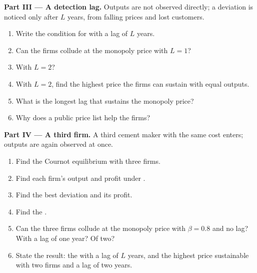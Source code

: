 \begin{problem}
\medskip
\noindent\textbf{Part III --- A detection lag.} Outputs are not observed directly; a deviation is noticed only after $L$
years, from falling prices and lost customers.
\begin{enumerate}[resume]
  \item Write the condition for  with a lag of $L$ years.
  \item Can the firms collude at the monopoly price with $L = 1$?
  \item With $L = 2$?
  \item With $L = 2$, find the highest price the firms can sustain with equal outputs.
  \item What is the longest lag that sustains the monopoly price?
  \item Why does a public price list help the firms?
\end{enumerate}

\medskip
\noindent\textbf{Part IV --- A third firm.} A third cement maker with the same cost enters; outputs are again observed at
once.
\begin{enumerate}[resume]
  \item Find the Cournot equilibrium with three firms.
  \item Find each firm's output and profit under .
  \item Find the best deviation and its profit.
  \item Find the .
  \item Can the three firms collude at the monopoly price with $\beta = 0.8$ and no lag? With a lag of one year? Of two?
  \item State the result: the  with a lag of $L$ years, and the highest price sustainable with
    two firms and a lag of two years.
\end{enumerate}
\end{problem}
